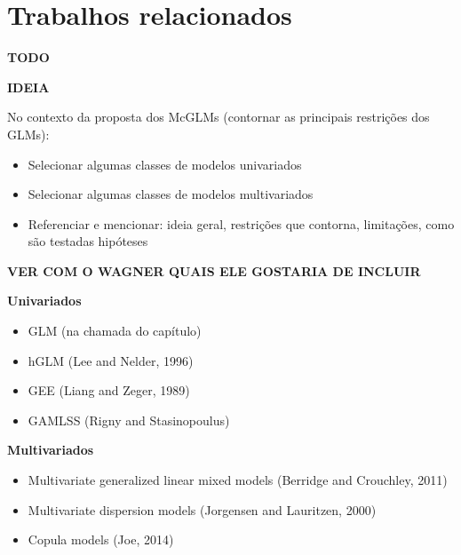 \chapter{Trabalhos relacionados}


\textbf{TODO}


\textbf{IDEIA}

No contexto da proposta dos McGLMs (contornar as principais restrições dos GLMs):

\begin{itemize}
  \item Selecionar algumas classes de modelos univariados
  \item Selecionar algumas classes de modelos multivariados
  \item Referenciar e mencionar: ideia geral, restrições que contorna, limitações, como são testadas hipóteses
\end{itemize}


\textbf{VER COM O WAGNER QUAIS ELE GOSTARIA DE INCLUIR}


\textbf{Univariados}

\begin{itemize}
  
  \item GLM (na chamada do capítulo)
  
  \item hGLM (Lee and Nelder, 1996)
  
  \item GEE (Liang and Zeger, 1989)
  
  \item GAMLSS (Rigny and Stasinopoulus)
  
\end{itemize}


\textbf{Multivariados}

\begin{itemize}
 
  \item Multivariate generalized linear mixed models (Berridge and Crouchley, 2011)
  
  \item Multivariate dispersion models (Jorgensen and Lauritzen, 2000)
  
  \item Copula models (Joe, 2014)
  
\end{itemize}

